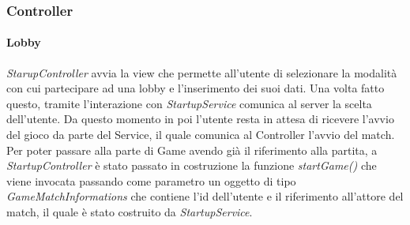 \subsubsection{Controller}
\paragraph{Lobby}
\textit{StarupController} avvia la view che permette all’utente di selezionare la modalità con cui partecipare ad una lobby e l’inserimento dei suoi dati. Una volta fatto questo, tramite l’interazione con \textit{StartupService} comunica al server la scelta dell’utente. \newline Da questo momento in poi l’utente resta in attesa di ricevere l’avvio del gioco da parte del Service, il quale comunica al Controller l’avvio del match.\newline
Per poter passare alla parte di Game avendo già il riferimento alla partita, a \textit{StartupController} è stato passato in costruzione la funzione \textit{startGame()} che viene invocata passando come parametro un oggetto di tipo \textit{GameMatchInformations} che contiene l’id dell’utente e il riferimento all’attore del match, il quale è stato costruito da \textit{StartupService}.
